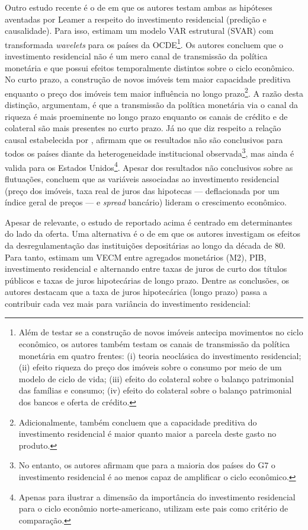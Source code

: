 Outro estudo recente é o de \textcite{huang_is_2018} em que os autores testam ambas as hipóteses aventadas por Leamer a respeito do investimento residencial (predição e causalidade). Para isso, estimam um modelo VAR estrutural (SVAR) com transformada \textit{wavelets} para os países da OCDE\footnote{
	Além de testar se a construção de novos imóveis antecipa movimentos no ciclo econômico, os autores também testam os canais de transmissão da política monetária em quatro frentes: (i) teoria neoclásica do investimento residencial; (ii) efeito riqueza do preço dos imóveis sobre o consumo por meio de um modelo de ciclo de vida; (iii) efeito do colateral sobre o balanço patrimonial das famílias e consumo; (iv) efeito do colateral sobre o balanço patrimonial dos bancos e oferta de crédito.}.  
Os autores concluem que o investimento residencial não é um mero canal de transmissão da política monetária e que possui efeitos temporalmente distintos sobre o ciclo econômico. No curto prazo, a construção de novos imóveis tem maior capacidade preditiva enquanto o preço dos imóveis tem maior influência no longo prazo\footnote{Adicionalmente, \textcite{huang_is_2018} também concluem que a capacidade preditiva do investimento residencial é maior quanto maior a parcela deste gasto no produto.}. A razão desta distinção, argumentam, é que a transmissão da política monetária via o canal da riqueza é mais proeminente no longo prazo enquanto os canais de crédito e de colateral são mais presentes no curto prazo. Já no que diz respeito a relação causal estabelecida por \textcite{leamer_housing_2007}, afirmam que os resultados não são conclusivos para todos os países diante da heterogeneidade institucional observada\footnote{
	No entanto, os autores afirmam que para a maioria dos países do G7 o investimento residencial é ao menos capaz de amplificar o ciclo econômico.}, mas ainda é valida para os Estados Unidos\footnote{
	Apenas para ilustrar a dimensão da importância do investimento residencial para o ciclo econômio norte-americano, \textcite{huang_is_2018} utilizam este pais como critério de comparação.}.
Apesar dos resultados não conclusivos sobre as flutuações, concluem que as variáveis associadas ao investimento residencial (preço dos imóveis, taxa real de juros das hipotecas --- deflacionada por um índice geral de preços --- e \textit{spread} bancário) lideram o crescimento econômico.

Apesar de relevante, o estudo  de \textcite{huang_is_2018} reportado acima é centrado em determinantes do lado da oferta.
Uma alternativa é o de \textcite{gauger_residential_2003} em que os autores investigam os efeitos da desregulamentação das instituições depositárias ao longo da década de 80. Para tanto, estimam um VECM entre agregados monetários (M2), PIB, investimento residencial e alternando entre taxas de juros  de curto dos títulos públicos e taxas de juros hipotecárias de longo prazo.
Dentre as conclusões, os autores destacam que a taxa de juros hipotecárica (longo prazo) passa a contribuir cada vez mais para variância do investimento residencial:


